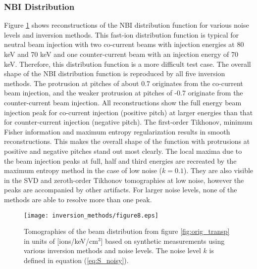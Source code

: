 \subsubsection{NBI Distribution}
Figure \ref{fig:tomos_transp} shows reconstructions of the NBI distribution function for various noise levels and inversion methods.
This fast-ion distribution function is typical for neutral beam injection with two co-current beams with injection energies at 80 keV and 70 keV and one counter-current beam with an injection energy of 70 keV. 
Therefore, this distribution function is a more difficult test case. 
The overall shape of the NBI distribution function is reproduced by all five inversion methods. The protrusion at pitches of about 0.7 originates from the co-current beam injection, and the weaker protrusion at pitches of -0.7 originate from the counter-current beam injection. All reconstructions show the full energy beam injection peak for co-current injection (positive pitch) at larger energies than that for counter-current injection (negative pitch). 
The first-order Tikhonov, minimum Fisher information and maximum entropy regularization results in smooth reconstructions. This makes the overall shape of the function with protrusions at positive and negative pitches stand out most clearly. 
The local maxima due to the beam injection peaks at full, half and third energies are recreated by the maximum entropy method in the case of low noise ($k=0.1$). They are also visible in the SVD and zeroth-order Tikhonov tomographies at low noise, however the peaks are accompanied by other artifacts.
For larger noise levels, none of the methods are able to resolve more than one peak.
\begin{figure}[h!]
    \centering
    \texttt{[image: inversion\_methods/figure8.eps]}
    \caption{Tomographies of the beam distribution from figure \ref{fig:orig_transp} in units of [ions/keV/cm$^3$] based on synthetic measurements using various inversion methods and noise levels. The noise level $k$ is defined in equation (\ref{eq:S_noisy}).} \label{fig:tomos_transp}
\end{figure}

